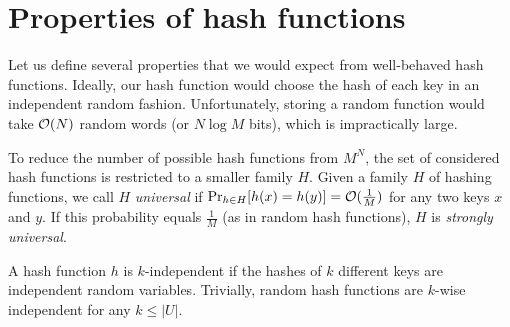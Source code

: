 \section{Properties of hash functions}
Let us define several properties that we would expect from well-behaved hash
functions. Ideally, our hash function would choose the hash of each key
in an independent random fashion. Unfortunately, storing a random function
would take $\mathcal{O}(N)$ random words (or $N \log M$ bits), which is impractically
large.

To reduce the number of possible hash functions from $M^N$, the set of
considered hash functions is restricted to a smaller family $H$.
Given a family $H$ of hashing functions, we call $H$ \emph{universal} if
$\Pr_{h\in H}[h(x)=h(y)]=\mathcal{O}(\frac{1}{M})$ for any two keys $x$ and $y$.
If this probability equals $\frac{1}{M}$ (as in random hash functions),
$H$ is \emph{strongly universal}. %

A hash function $h$ is $k$-independent if the hashes of $k$ different keys
are independent random variables. Trivially, random hash functions are
$k$-wise independent for any $k\leq |U|$.
